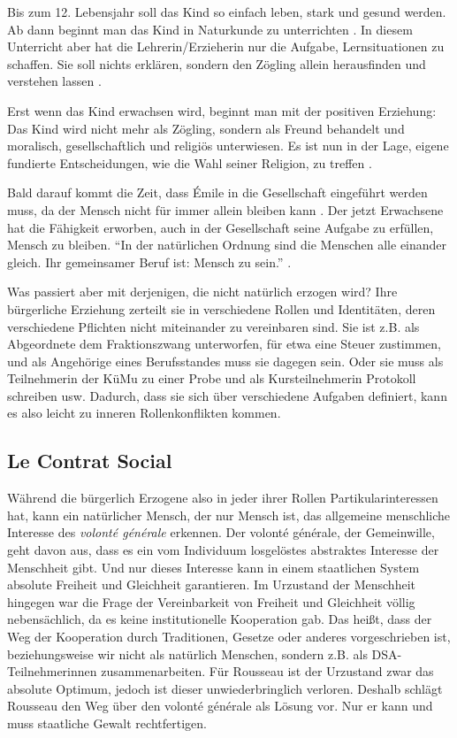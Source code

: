 Bis zum 12. Lebensjahr soll das Kind so einfach leben, stark und gesund werden.
Ab dann beginnt man das Kind in Naturkunde zu unterrichten \parencite[55]{rousseau-1762}.
In diesem Unterricht aber hat die Lehrerin/Erzieherin nur die Aufgabe, Lernsituationen zu schaffen.
Sie soll nichts erklären, sondern den Zögling allein herausfinden und verstehen lassen \parencite[56]{rousseau-1762}.

Erst wenn das Kind erwachsen wird, beginnt man mit der positiven Erziehung:
Das Kind wird nicht mehr als Zögling, sondern als Freund behandelt und moralisch, gesellschaftlich und religiös unterwiesen.
Es ist nun in der Lage, eigene fundierte Entscheidungen, wie die Wahl seiner Religion, zu treffen \parencite[60f.]{rousseau-1762}.

Bald darauf kommt die Zeit, dass Émile in die Gesellschaft eingeführt werden muss, da der Mensch nicht für immer allein bleiben kann \parencite[61]{rousseau-1762}.
Der jetzt Erwachsene hat die Fähigkeit erworben, auch in der Gesellschaft seine Aufgabe zu erfüllen, Mensch zu bleiben.
``In der natürlichen Ordnung sind die Menschen alle einander gleich. Ihr gemeinsamer Beruf ist: Mensch zu sein.''
\parencite[50]{rousseau-1762}.

Was passiert aber mit derjenigen, die nicht natürlich erzogen wird?
Ihre bürgerliche Erziehung zerteilt sie in verschiedene Rollen und Identitäten, deren verschiedene Pflichten nicht miteinander zu vereinbaren sind.
Sie ist z.B. als Abgeordnete dem Fraktionszwang unterworfen, für etwa eine Steuer zustimmen, und als Angehörige eines Berufsstandes muss sie dagegen sein.
Oder sie muss als Teilnehmerin der KüMu zu einer Probe und als Kursteilnehmerin Protokoll schreiben usw.
Dadurch, dass sie sich über verschiedene Aufgaben definiert, kann es also leicht zu inneren Rollenkonflikten kommen.


\subsection{Le Contrat Social}

Während die bürgerlich Erzogene also in jeder ihrer Rollen Partikularinteressen hat, kann ein natürlicher Mensch, der nur Mensch ist, das allgemeine menschliche Interesse des \emph{volonté générale} erkennen.
Der volonté générale, der Gemeinwille, geht davon aus, dass es ein vom Individuum losgelöstes abstraktes Interesse der Menschheit gibt.
Und nur dieses Interesse kann in einem staatlichen System absolute Freiheit und Gleichheit garantieren.
Im Urzustand der Menschheit hingegen war die Frage der Vereinbarkeit von Freiheit und Gleichheit völlig nebensächlich, da es keine institutionelle Kooperation gab.
Das heißt, dass der Weg der Kooperation durch Traditionen, Gesetze oder anderes vorgeschrieben ist, beziehungsweise wir nicht als natürlich Menschen, sondern z.B. als DSA-Teilnehmerinnen zusammenarbeiten.
Für Rousseau ist der Urzustand zwar das absolute Optimum, jedoch ist dieser unwiederbringlich verloren.
Deshalb schlägt Rousseau den Weg über den volonté générale als Lösung vor.
Nur er kann und muss staatliche Gewalt rechtfertigen.

